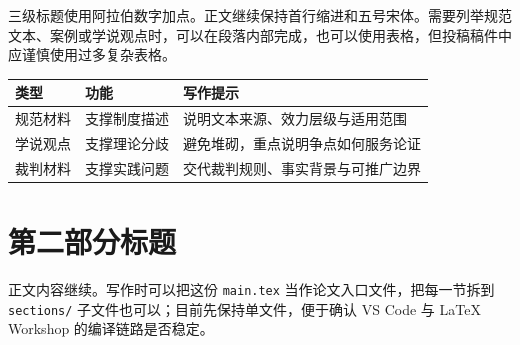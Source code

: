 \documentclass[UTF8,a4paper,zihao=5]{ctexart}
\begin{document}
三级标题使用阿拉伯数字加点。正文继续保持首行缩进和五号宋体。需要列举规范文本、案例或学说观点时，可以在段落内部完成，也可以使用表格，但投稿稿件中应谨慎使用过多复杂表格。

\begin{tabularx}{\textwidth}{|Y|Y|Y|}
  \hline
  类型 & 功能 & 写作提示 \\
  \hline
  规范材料 & 支撑制度描述 & 说明文本来源、效力层级与适用范围 \\
  \hline
  学说观点 & 支撑理论分歧 & 避免堆砌，重点说明争点如何服务论证 \\
  \hline
  裁判材料 & 支撑实践问题 & 交代裁判规则、事实背景与可推广边界 \\
  \hline
\end{tabularx}

\section{第二部分标题}

正文内容继续。写作时可以把这份 \verb|main.tex| 当作论文入口文件，把每一节拆到 \verb|sections/| 子文件也可以；目前先保持单文件，便于确认 VS Code 与 LaTeX Workshop 的编译链路是否稳定。
\end{document}
